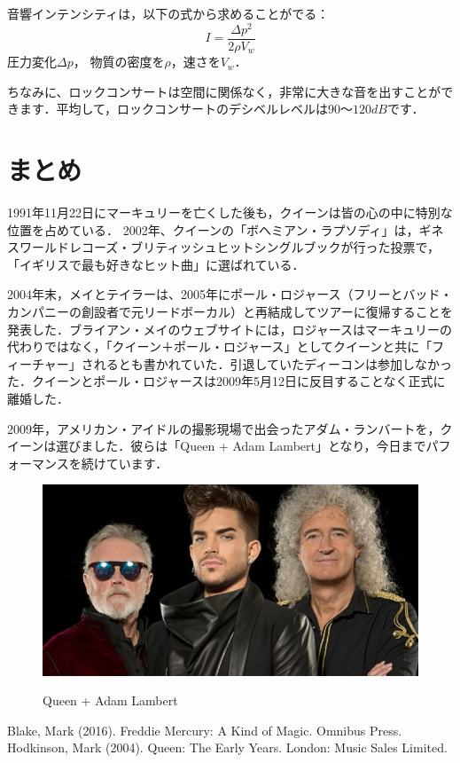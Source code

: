 \documentclass[a4j, twocolumn]{jarticle}
\begin{document}
音響インテンシティは，以下の式から求めることがでる：
\begin{equation}
  \label{eq1}
  I = 
  \frac{
    \Delta p^2
  }{
    2\rho V_w
  }
\end{equation}
圧力変化$\Delta p$， 物質の密度を$\rho$，速さを$V_w$．

ちなみに、ロックコンサートは空間に関係なく，非常に大きな音を出すことができます．平均して，ロックコンサートのデシベルレベルは$90 ～ 120 dB$です．

\section{まとめ}

1991年11月22日にマーキュリーを亡くした後も，クイーンは皆の心の中に特別な位置を占めている．
2002年、クイーンの「ボヘミアン・ラプソディ」は，ギネスワールドレコーズ・ブリティッシュヒットシングルブックが行った投票で，「イギリスで最も好きなヒット曲」に選ばれている．

2004年末，メイとテイラーは、2005年にポール・ロジャース（フリーとバッド・カンパニーの創設者で元リードボーカル）と再結成してツアーに復帰することを発表した．ブライアン・メイのウェブサイトには，ロジャースはマーキュリーの代わりではなく，「クイーン＋ポール・ロジャース」としてクイーンと共に「フィーチャー」されるとも書かれていた．引退していたディーコンは参加しなかった．クイーンとポール・ロジャースは2009年5月12日に反目することなく正式に離婚した．

2009年，アメリカン・アイドルの撮影現場で出会ったアダム・ランバートを，クイーンは選びました．彼らは「Queen + Adam Lambert」となり，今日までパフォーマンスを続けています．

\begin{figure}[htb]
  \begin{center}
      \includegraphics[scale=0.3]{queen_adam_lambert.jpg}
      \caption{Queen + Adam Lambert}
      \vspace{-15pt}
      \label{QueenAdam}
  \end{center}
\end{figure}

\begin{thebibliography}{99}
  Blake, Mark (2016). Freddie Mercury: A Kind of Magic. Omnibus Press.
  Hodkinson, Mark (2004). Queen: The Early Years. London: Music Sales Limited.
\end{thebibliography}
\end{document}
